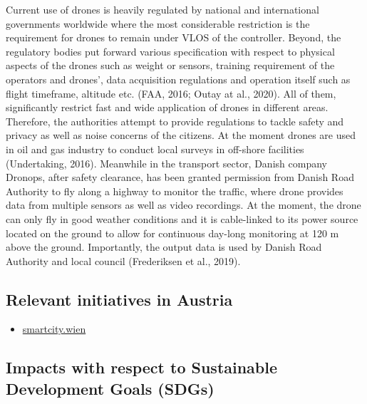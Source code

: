\documentclass[
]{book}
\providecommand{\tightlist}{%
  \setlength{\itemsep}{0pt}\setlength{\parskip}{0pt}}
\begin{document}
Current use of drones is heavily regulated by national and international governments worldwide where the most considerable restriction is the requirement for drones to remain under VLOS of the controller. Beyond, the regulatory bodies put forward various specification with respect to physical aspects of the drones such as weight or sensors, training requirement of the operators and drones', data acquisition regulations and operation itself such as flight timeframe, altitude etc. (FAA, 2016; Outay at al., 2020). All of them, significantly restrict fast and wide application of drones in different areas. Therefore, the authorities attempt to provide regulations to tackle safety and privacy as well as noise concerns of the citizens. At the moment drones are used in oil and gas industry to conduct local surveys in off-shore facilities (Undertaking, 2016). Meanwhile in the transport sector, Danish company Dronops, after safety clearance, has been granted permission from Danish Road Authority to fly along a highway to monitor the traffic, where drone provides data from multiple sensors as well as video recordings. At the moment, the drone can only fly in good weather conditions and it is cable-linked to its power source located on the ground to allow for continuous day-long monitoring at 120 m above the ground. Importantly, the output data is used by Danish Road Authority and local council (Frederiksen et al., 2019).

\hypertarget{relevant-initiatives-in-austria-2}{%
\subsection*{Relevant initiatives in Austria}\label{relevant-initiatives-in-austria-2}}

\begin{itemize}
\tightlist
\item
  \href{https://smartcity.wien.gv.at/site/en/smart-inspection/}{smartcity.wien}
\end{itemize}

\hypertarget{impacts-with-respect-to-sustainable-development-goals-sdgs-2}{%
\subsection*{Impacts with respect to Sustainable Development Goals (SDGs)}\label{impacts-with-respect-to-sustainable-development-goals-sdgs-2}}
\end{document}
